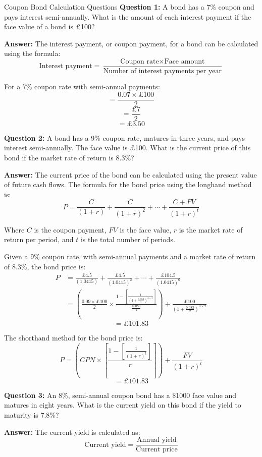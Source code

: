 \begin{examplebox}{Coupon Bond Calculation Questions}
\textbf{Question 1:} A bond has a 7\% coupon and pays interest semi-annually. What is the amount of each interest payment if the face value of a bond is \pounds100?

\textbf{Answer:}
The interest payment, or coupon payment, for a bond can be calculated using the formula:
\[ \text{Interest payment} = \frac{\text{Coupon rate} \times \text{Face amount}}{\text{Number of interest payments per year}} \]

For a 7\% coupon rate with semi-annual payments:
\[ = \frac{0.07 \times \pounds100}{2} \]
\[ = \frac{\pounds7}{2} \]
\[ = \pounds3.50 \]

\textbf{Question 2:} A bond has a 9\% coupon rate, matures in three years, and pays interest semi-annually. The face value is \pounds100. What is the current price of this bond if the market rate of return is 8.3\%?

\textbf{Answer:}
The current price of the bond can be calculated using the present value of future cash flows. The formula for the bond price using the longhand method is:
\[ P = \frac{C}{(1+r)} + \frac{C}{(1+r)^2} + \cdots + \frac{C + FV}{(1+r)^t} \]

Where \( C \) is the coupon payment, \( FV \) is the face value, \( r \) is the market rate of return per period, and \( t \) is the total number of periods.

Given a 9\% coupon rate, with semi-annual payments and a market rate of return of 8.3\%, the bond price is:
\begin{align*} P &= \frac{\pounds4.5}{(1.0415)}  +  \frac{\pounds4.5}{(1.0415)^2} + \cdots + \frac{\pounds104.5}{(1.0415)^6} \\
&=\left(\frac{0.09\times£100}{2}\times\frac{1-\left[\frac{1}{\left(1+\frac{0.083}{2}\right)^{3\times2}}\right]}{\frac{0.083}{2}}\right)+\frac{£100}{\left(1+\frac{0.083}{2}\right)^{3\times2}}
\end{align*}
\[ = \pounds101.83 \]

The shorthand method for the bond price is:
\[ P = \left( CPN \times \left[ \frac{1 - \left[ \frac{1}{(1+r)^t} \right]}{r} \right] \right) + \frac{FV}{(1+r)^t} \]
\[ = \pounds101.83 \]

\textbf{Question 3:} An 8\%, semi-annual coupon bond has a \$1000 face value and matures in eight years. What is the current yield on this bond if the yield to maturity is 7.8\%?

\textbf{Answer:}
The current yield is calculated as:
\[ \text{Current yield} = \frac{\text{Annual yield}}{\text{Current price}} \]


\end{examplebox}
